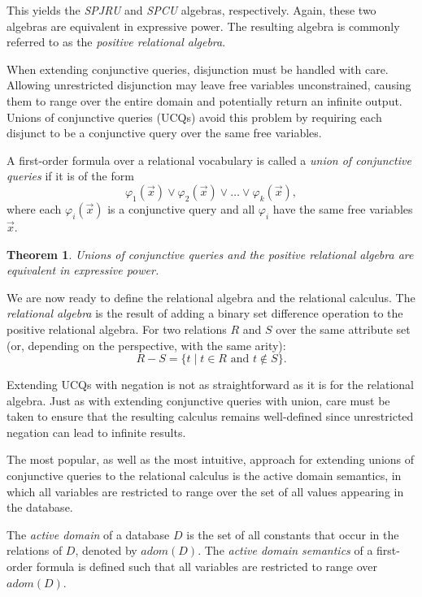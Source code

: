 \documentclass[oneside, 11pt]{amsbook}
\theoremstyle{plain}
\newtheorem{thm}{Theorem}[section]
\theoremstyle{definition}
\theoremstyle{remark}
\begin{document}
This yields the \emph{SPJRU} and \emph{SPCU} algebras, respectively. Again, these two algebras are equivalent in expressive power. The resulting algebra is commonly referred to as the \emph{positive relational algebra}.

When extending conjunctive queries, disjunction must be handled with care. Allowing unrestricted disjunction may leave free variables unconstrained, causing them to range over the entire domain and potentially return an infinite output. Unions of conjunctive queries (UCQs) avoid this problem by requiring each disjunct to be a conjunctive query over the same free variables.

\begin{defn}
    A first-order formula over a relational vocabulary is called a \emph{union of conjunctive queries} if it is of the form
    \[
        \varphi_1(\vec{x}) \lor \varphi_2(\vec{x}) \lor \dots \lor \varphi_k(\vec{x}),
    \]
    where each $\varphi_i(\vec{x})$ is a conjunctive query and all $\varphi_i$ have the same free variables $\vec{x}$.
\end{defn}

\begin{thm}
    Unions of conjunctive queries and the positive relational algebra are equivalent in expressive power.
\end{thm}

We are now ready to define the relational algebra and the relational calculus. The \emph{relational algebra} is the result of adding a binary set difference operation to the positive relational algebra. For two relations $R$ and $S$ over the same attribute set (or, depending on the perspective, with the same arity):
\[
    R - S = \{ t \mid t \in R \text{ and } t \notin S \}.
\]

Extending UCQs with negation is not as straightforward as it is for the relational algebra. Just as with extending conjunctive queries with union, care must be taken to ensure that the resulting calculus remains well-defined since unrestricted negation can lead to infinite results.

The most popular, as well as the most intuitive, approach for extending unions of conjunctive queries to the relational calculus is the active domain semantics, in which all variables are restricted to range over the set of all values appearing in the database.

\begin{defn}
    The \emph{active domain} of a database $D$ is the set of all constants that occur in the relations of $D$, denoted by $adom(D)$. The \emph{active domain semantics} of a first-order formula is defined such that all variables are restricted to range over $adom(D)$.
\end{defn}
\end{document}
